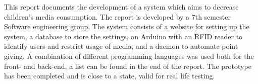 This report documents the development of a system which aims to decrease children's media consumption. 
The report is developed by a 7th semester Software engineering group.
The system consists of a website for setting up the system, a database to store the settings, an Arduino with an RFID reader to identify users and restrict usage of media, and a daemon to automate point giving.
A combination of different programming languages was used both for the front- and back-end, a list can be found in the end of the report.
The prototype has been completed and is close to a state, valid for real life testing.